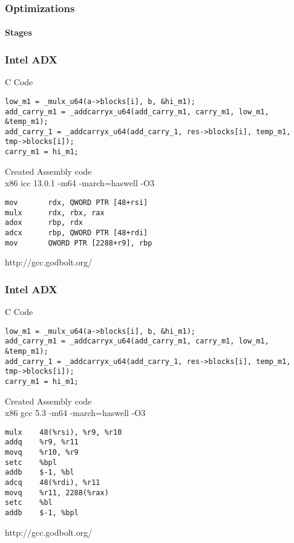 \begin{frame}
\frametitle{Optimizations}
\framesubtitle{Stages}
\end{frame}

\begin{frame}[fragile]
\frametitle{Intel ADX}
C Code
\begin{lstlisting}[frame=single, basicstyle=\tiny]
low_m1 = _mulx_u64(a->blocks[i], b, &hi_m1); 
add_carry_m1 = _addcarryx_u64(add_carry_m1, carry_m1, low_m1, &temp_m1);
add_carry_1 = _addcarryx_u64(add_carry_1, res->blocks[i], temp_m1, tmp->blocks[i]);
carry_m1 = hi_m1;
\end{lstlisting}
Created Assembly code\\
x86 icc 13.0.1 -m64 -march=haswell -O3
\begin{lstlisting}[frame=single, basicstyle=\tiny, language={[x86masm]Assembler}]
mov       rdx, QWORD PTR [48+rsi]
mulx      rdx, rbx, rax
adox      rbp, rdx
adcx      rbp, QWORD PTR [48+rdi]
mov       QWORD PTR [2288+r9], rbp 
\end{lstlisting}
\vfill
\tiny{http://gcc.godbolt.org/}
\end{frame}

\begin{frame}[fragile]
\frametitle{Intel ADX}
C Code
\begin{lstlisting}[frame=single, basicstyle=\tiny]
low_m1 = _mulx_u64(a->blocks[i], b, &hi_m1); 
add_carry_m1 = _addcarryx_u64(add_carry_m1, carry_m1, low_m1, &temp_m1);
add_carry_1 = _addcarryx_u64(add_carry_1, res->blocks[i], temp_m1, tmp->blocks[i]);
carry_m1 = hi_m1;
\end{lstlisting}
Created Assembly code\\
x86 gcc 5.3 -m64 -march=haswell -O3
\begin{lstlisting}[frame=single, basicstyle=\tiny, language={[x86masm]Assembler}]
mulx    48(%rsi), %r9, %r10
addq    %r9, %r11
movq    %r10, %r9
setc    %bpl
addb    $-1, %bl
adcq    48(%rdi), %r11
movq    %r11, 2288(%rax)
setc    %bl
addb    $-1, %bpl
\end{lstlisting}
\vfill
\tiny{http://gcc.godbolt.org/}
\end{frame}

